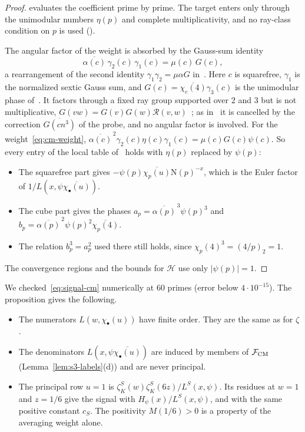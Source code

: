 \documentclass[11pt]{article}
\numberwithin{equation}{section}
\newcommand{\N}{\mathrm N}
\begin{document}
\begin{proof}
\cite{OAI78} evaluates the coefficient prime by prime. The target enters only through
the unimodular numbers $\eta(p)$ and complete multiplicativity, and no ray-class
condition on $p$ is used (\cite[Section~7.2]{OAI78}).

The angular factor of the weight is absorbed by the Gauss-sum identity
\begin{equation}\label{eq:signal-cm}
 \overline{\alpha(c)}\,\gamma_2(c)\,\gamma_1(c)=\mu(c)\,G(c),
\end{equation}
a rearrangement of the second identity $\gamma_1\gamma_2=\mu\alpha G$ in~\cite[eq.~(4.7)]{OAI78}.
Here $c$ is squarefree, $\gamma_1$ is the normalized sextic Gauss sum, and $G(c)=\overline{\chi_c(4)}\gamma_3(c)$ is the
unimodular phase of~\cite[Lemma~4.4]{OAI78}. It factors through a fixed ray group supported
over $2$ and $3$ but is not multiplicative, $G(vw)=G(v)G(w)\mathcal R(v,w)$~\cite[eq.~(4.5)]{OAI78};
as in~\cite{OAI78} it is cancelled by the correction $\overline{G(cn^3)}$ of the probe, and no angular factor is
involved. For the
weight~\eqref{eq:cm-weight}, $\overline{\alpha(c)}^{\,2}\gamma_2(c)\eta(c)\gamma_1(c)=\mu(c)G(c)\psi(c)$.
So every entry of the local table of~\cite{OAI78} holds with $\eta(p)$ replaced by
$\psi(p)$:
\begin{itemize}
\item The squarefree part gives $-\psi(p)\overline{\chi_p(u)}\N(p)^{-x}$, which is the
 Euler factor of $1/L(x,\psi\overline{\chi_\bullet(u)})$.
\item The cube part gives the phases $a_p=\overline{\alpha(p)}^{\,3}\psi(p)^3$ and
 $b_p=\overline{\alpha(p)}^{\,2}\psi(p)^2\overline{\chi_p(4)}$.
\item The relation $b_p^3=a_p^2$ used there still holds, since $\chi_p(4)^3=(4/p)_2=1$.
\end{itemize}
The convergence regions and the bounds for $\mathcal H$ use only $|\psi(p)|=1$.
\end{proof}
We checked~\eqref{eq:signal-cm} numerically at $60$ primes (error below
$4\cdot10^{-15}$). The proposition gives the following.
\begin{itemize}
\item The numerators $L(w,\chi_\bullet(u))$ have finite order. They are the same as for
 $\zeta$.
\item The denominators $L(x,\psi\overline{\chi_\bullet(u)})$ are induced by members of $\mathcal F_{\rm CM}$
 (Lemma~\ref{lem:s3-labels}(d)) and are never principal.
\item The principal row $u=1$ is $\zeta_K^S(w)\zeta_K^S(6z)/L^S(x,\psi)$. Its residues at
 $w=1$ and $z=1/6$ give the signal with $H_\psi(x)/L^S(x,\psi)$, and with the same
 positive constant $c_S$. The positivity $M(1/6)>0$ is a property of the averaging
 weight alone.
\end{itemize}
\end{document}
